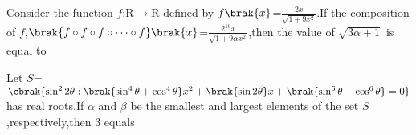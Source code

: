     \item Consider the function $f$:R$\to$R defined by $f\brak{x}$=$\frac{2x}{\sqrt{1+9x^2}}$.If the composition of $f$,$\brak{f\circ f\circ f\circ \dots \circ f}\brak{x}$=$\frac{2^{10}x}{\sqrt{1+9\alpha x^2}}$,then the value of $\sqrt{3\alpha+1}$ is equal to
    \item Let $S$=$\cbrak{\sin^2{2\theta}:\brak{\sin^4{\theta}+\cos^4{\theta}}x^2+\brak{\sin{2\theta}}x+\brak{\sin^6{\theta}+\cos^6{\theta}}=0}$ has real roots.If $\alpha$ and $\beta$ be the smallest and largest elements of the set $S$,respectively,then 3 equals

